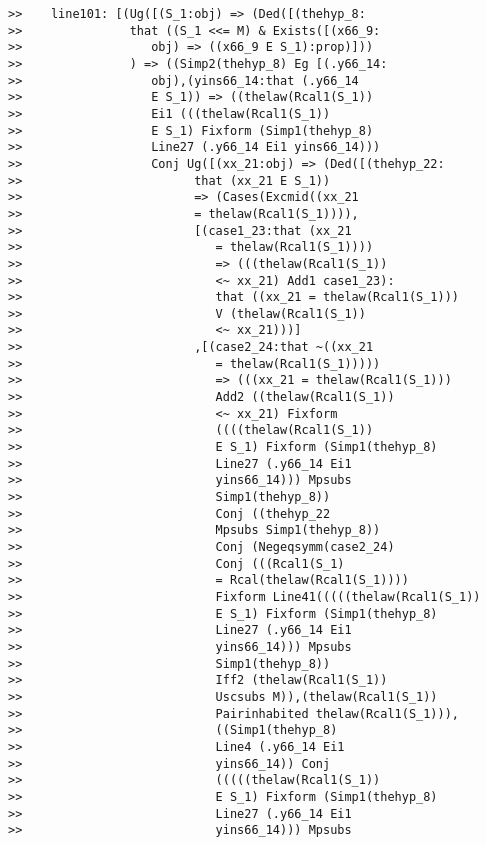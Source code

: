\documentclass[12pt]{article}
\begin{document}
\begin{verbatim}
>>    line101: [(Ug([(S_1:obj) => (Ded([(thehyp_8:
>>               that ((S_1 <<= M) & Exists([(x66_9:
>>                  obj) => ((x66_9 E S_1):prop)]))
>>               ) => ((Simp2(thehyp_8) Eg [(.y66_14:
>>                  obj),(yins66_14:that (.y66_14
>>                  E S_1)) => ((thelaw(Rcal1(S_1))
>>                  Ei1 (((thelaw(Rcal1(S_1))
>>                  E S_1) Fixform (Simp1(thehyp_8)
>>                  Line27 (.y66_14 Ei1 yins66_14)))
>>                  Conj Ug([(xx_21:obj) => (Ded([(thehyp_22:
>>                        that (xx_21 E S_1))
>>                        => (Cases(Excmid((xx_21
>>                        = thelaw(Rcal1(S_1)))),
>>                        [(case1_23:that (xx_21
>>                           = thelaw(Rcal1(S_1))))
>>                           => (((thelaw(Rcal1(S_1))
>>                           <~ xx_21) Add1 case1_23):
>>                           that ((xx_21 = thelaw(Rcal1(S_1)))
>>                           V (thelaw(Rcal1(S_1))
>>                           <~ xx_21)))]
>>                        ,[(case2_24:that ~((xx_21
>>                           = thelaw(Rcal1(S_1)))))
>>                           => (((xx_21 = thelaw(Rcal1(S_1)))
>>                           Add2 ((thelaw(Rcal1(S_1))
>>                           <~ xx_21) Fixform
>>                           ((((thelaw(Rcal1(S_1))
>>                           E S_1) Fixform (Simp1(thehyp_8)
>>                           Line27 (.y66_14 Ei1
>>                           yins66_14))) Mpsubs
>>                           Simp1(thehyp_8))
>>                           Conj ((thehyp_22
>>                           Mpsubs Simp1(thehyp_8))
>>                           Conj (Negeqsymm(case2_24)
>>                           Conj (((Rcal1(S_1)
>>                           = Rcal(thelaw(Rcal1(S_1))))
>>                           Fixform Line41(((((thelaw(Rcal1(S_1))
>>                           E S_1) Fixform (Simp1(thehyp_8)
>>                           Line27 (.y66_14 Ei1
>>                           yins66_14))) Mpsubs
>>                           Simp1(thehyp_8))
>>                           Iff2 (thelaw(Rcal1(S_1))
>>                           Uscsubs M)),(thelaw(Rcal1(S_1))
>>                           Pairinhabited thelaw(Rcal1(S_1))),
>>                           ((Simp1(thehyp_8)
>>                           Line4 (.y66_14 Ei1
>>                           yins66_14)) Conj
>>                           (((((thelaw(Rcal1(S_1))
>>                           E S_1) Fixform (Simp1(thehyp_8)
>>                           Line27 (.y66_14 Ei1
>>                           yins66_14))) Mpsubs

\end{verbatim}
\end{document}
